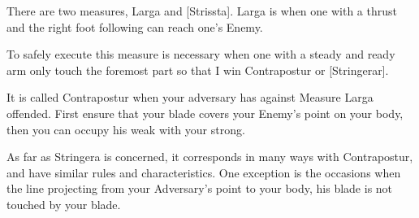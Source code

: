 \newpage


\newpage


 There are two measures, Larga and [Strissta]. Larga is when one with
 a thrust and the right foot following can reach one's Enemy.

To safely execute this measure is necessary when one with a steady and
ready arm only touch the foremost part so that I win Contrapostur or
[Stringerar].

It is called Contrapostur when your adversary has against Measure
Larga offended. First ensure that your blade covers your Enemy's point
on your body, then you can occupy his weak with your strong.

As far as Stringera is concerned, it corresponds in many ways with
Contrapostur, and have similar rules and characteristics.
One exception is the occasions when the line projecting from your
Adversary's point to your body, his blade is not touched by your
blade.

